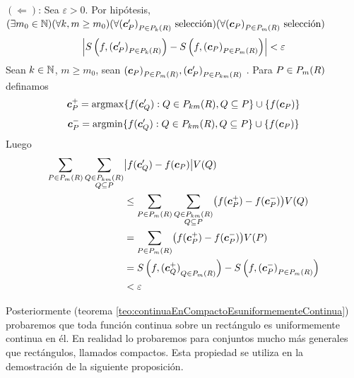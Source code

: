 \begin{demostracion}
\smallskip

$(\Leftarrow)$: Sea $ \varepsilon > 0 $. Por hip\'otesis, $ ( \exists  m_0\in \mathbb{N}) ( \forall k, m \geq m_0 ) ( \forall {(\boldsymbol{c}'_P)}_{P \in P_{k}(R)} \allowbreak \text{ selecci\'on}) (\forall {(\boldsymbol{c}_P)}_{P \in P_{m}(R)} \allowbreak \text{ selecci\'on} ) $
\[ \left\lvert S\left(f, {(\boldsymbol{c}'_P)}_{P \in P_{k}(R)}\right) - S\left(f, {(\boldsymbol{c}_P)}_{P \in P_{m}(R)}\right) \right\rvert < \varepsilon \]
Sean $k\in \mathbb{N}$, $ m \geq m_0 $, sean ${(\boldsymbol{c}_P)}_{P \in P_{m}(R)}, {(\boldsymbol{c}'_P)}_{P \in P_{km}(R)}$ \familiasEleccion{}. Para $ P \in P_{m}(R) $ definamos $$\boldsymbol{c}^+_P = \operatorname{argmax} \{f(\boldsymbol{c}'_Q):Q \in P_{km}(R),Q \subseteq P\} \cup \{f(\boldsymbol{c}_P)\}$$ $$\boldsymbol{c}^-_P = \operatorname{argmin} \{f(\boldsymbol{c}'_Q):Q \in P_{km}(R),Q \subseteq P\} \cup \{f(\boldsymbol{c}_P)\}$$
Luego
\begin{align*}
\sum_{P \in P_{m}(R)} \sum_{\substack{Q \in P_{km}(R) \\ Q
    \subseteq P}} &\bigr\lvert f(\boldsymbol{c}'_Q)-f(\boldsymbol{c}_P) \bigl\rvert V(Q) \\
& \leq \sum_{P \in P_{m}(R)} \sum_{\substack{Q \in P_{km}(R) \\
Q \subseteq P}} \bigl( f(\boldsymbol{c}^+_P)-f(\boldsymbol{c}^-_P) \bigr) V(Q) \\
& = \sum_{P \in P_{m}(R)} \bigl( f(\boldsymbol{c}^+_P)-f(\boldsymbol{c}^-_P) \bigr) V(P) \\
& = S\left(f, {(\boldsymbol{c}^+_Q)}_{Q \in P_{m}(R)}\right) - S\left(f,{(\boldsymbol{c}^-_P)}_{P \in P_{m}(R)}\right) \\
&< \varepsilon
\end{align*}
\end{demostracion}



Posteriormente (teorema \ref{teo:continuaEnCompactoEsuniformementeContinua}) probaremos que toda funci\'on continua sobre un rect\'angulo es uniformemente continua en \'el. En realidad lo probaremos para conjuntos mucho m\'as generales que rect\'angulos, llamados compactos. Esta propiedad se utiliza en la demostraci\'on de la siguiente proposici\'on.

